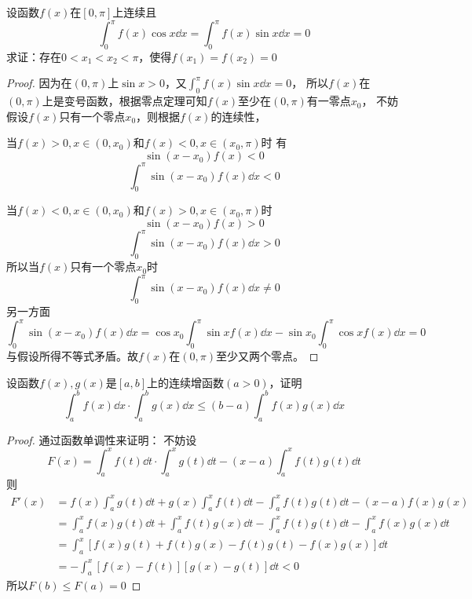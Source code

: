 \begin{example}
    设函数$f(x)$在$[0,\pi]$上连续且
    \[ \int_0^\pi f(x)\cos x\dd{x} = \int_0^\pi f(x)\sin x\dd{x} = 0 \]
    求证：存在$0<x_1<x_2<\pi$，使得$f(x_1)=f(x_2)=0$
\end{example}
\begin{proof}
    因为在$(0,\pi)$上$\sin x > 0$，又$\int_0^\pi f(x)\sin x\dd{x} = 0$，
    所以$f(x)$在$(0,\pi)$上是变号函数，根据零点定理可知$f(x)$至少在$(0,\pi)$有一零点$x_0$，
    不妨假设$f(x)$只有一个零点$x_0$，则根据$f(x)$的连续性，

    当$f(x)>0,x\in(0,x_0)$和$f(x)<0,x\in(x_0,\pi)$时
    有
    \[ \sin(x-x_0)f(x) < 0 \]
    \[ \int_0^\pi \sin(x-x_0)f(x)\dd{x} < 0 \]

    当$f(x)<0,x\in(0,x_0)$和$f(x)>0,x\in(x_0,\pi)$时
    \[ \sin(x-x_0)f(x) > 0 \]
    \[ \int_0^\pi \sin(x-x_0)f(x)\dd{x} > 0 \]
    所以当$f(x)$只有一个零点$x_0$时
    \[ \int_0^\pi \sin(x-x_0)f(x)\dd{x} \neq 0 \]
    另一方面
    \[
        \int_0^\pi \sin(x-x_0)f(x)\dd{x}
        =
        \cos x_0\int_0^\pi \sin xf(x)\dd{x} - \sin x_0\int_0^\pi \cos xf(x)\dd{x}
        =
        0
    \]
    与假设所得不等式矛盾。故$f(x)$在$(0,\pi)$至少又两个零点。
\end{proof}
\begin{example}
    设函数$f(x),g(x)$是$[a,b]$上的连续增函数$(a>0)$，证明
    \[ \int_a^bf(x)\dd{x} \cdot \int_a^bg(x)\dd{x} \leq (b-a)\int_a^bf(x)g(x)\dd{x} \]
\end{example}
\begin{proof}
    通过函数单调性来证明：
    不妨设
    \[ F(x) = \int_a^xf(t)\dd{t} \cdot \int_a^xg(t)\dd{t} - (x-a)\int_a^xf(t)g(t)\dd{t} \]
    则
    \begin{align*}
        F'(x) & = f(x)\int_a^xg(t)\dd{t} + g(x)\int_a^xf(t)\dd{t} - \int_a^xf(t)g(t)\dd{t} - (x-a)f(x)g(x)          \\
              & =\int_a^xf(x)g(t)\dd{t} + \int_a^xf(t)g(x)\dd{t} - \int_a^xf(t)g(t)\dd{t} - \int_a^x f(x)g(x)\dd{t} \\
              & =\int_a^x[f(x)g(t) + f(t)g(x) - f(t)g(t) -  f(x)g(x)]\dd{t}                                         \\
              & =-\int_a^x[f(x)- f(t)][g(x) - g(t)]\dd{t} < 0
    \end{align*}
    所以$F(b)\leq F(a)=0$
\end{proof}

